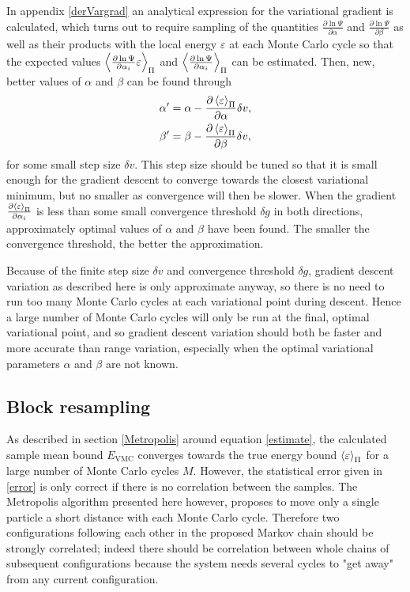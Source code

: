 \documentclass[a4paper,8pt]{article}
\begin{document}
\begin{multicols}{2}
In appendix \ref{derVargrad} an analytical expression for the variational gradient is calculated, which turns out to require sampling of the quantities $\frac{\partial\ln\Psi}{\partial\alpha}$ and $\frac{\partial\ln\Psi}{\partial\beta}$ as well as their products with the local energy $\varepsilon$ at each Monte Carlo cycle so that the expected values $\ev{\frac{\partial\ln\Psi}{\partial\alpha_i}\varepsilon}_\Pi$ and $\ev{\frac{\partial\ln\Psi}{\partial\alpha_i}}_\Pi$ can be estimated. Then, new, better values of $\alpha$ and $\beta$ can be found through
\begin{align}
\alpha' &= \alpha-\frac{\partial\ev{\varepsilon}_\Pi}{\partial\alpha}\delta v, \\
\beta' &= \beta-\frac{\partial\ev{\varepsilon}_\Pi}{\partial\beta}\delta v,
\end{align}
for some small step size $\delta v$. This step size should be tuned so that it is small enough for the gradient descent to converge towards the closest variational minimum, but no smaller as convergence will then be slower. When the gradient $\frac{\partial\ev{\varepsilon}_\Pi}{\partial\alpha_i}$ is less than some small convergence threshold $\delta g$ in both directions, approximately optimal values of $\alpha$ and $\beta$ have been found. The smaller the convergence threshold, the better the approximation.

Because of the finite step size $\delta v$ and convergence threshold $\delta g$, gradient descent variation as described here is only approximate anyway, so there is no need to run too many Monte Carlo cycles at each variational point during descent. Hence a large number of Monte Carlo cycles will only be run at the final, optimal variational point, and so gradient descent variation should both be faster and more accurate than range variation, especially when the optimal variational parameters $\alpha$ and $\beta$ are not known.


\subsection{Block resampling}\label{Bresampling}
As described in section \ref{Metropolis} around equation \eqref{estimate}, the calculated sample mean bound $E_\text{VMC}$ converges towards the true energy bound $\ev{\varepsilon}_\Pi$ for a large number of Monte Carlo cycles $M$. However, the statistical error given in \eqref{error} is only correct if there is no correlation between the samples. The Metropolis algorithm presented here however, proposes to move only a single particle a short distance with each Monte Carlo cycle. Therefore two configurations following each other in the proposed Markov chain should be strongly correlated; indeed there should be correlation between whole chains of subsequent configurations because the system needs several cycles to "get away" from any current configuration.


\end{multicols}
\end{document}
